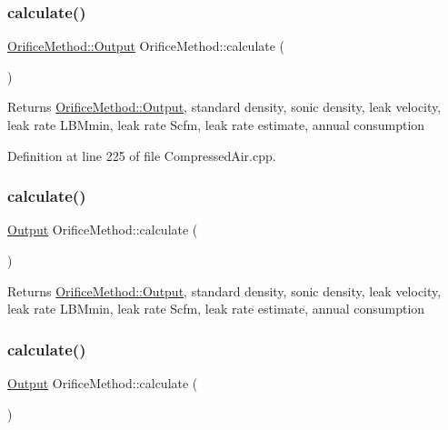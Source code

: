\subsubsection{\texorpdfstring{calculate()}{calculate()}\hspace{0.1cm}{\footnotesize\ttfamily [1/3]}}
{\footnotesize\ttfamily \hyperlink{struct_orifice_method_1_1_output}{Orifice\+Method\+::\+Output} Orifice\+Method\+::calculate (\begin{DoxyParamCaption}{ }\end{DoxyParamCaption})}

\begin{DoxyReturn}{Returns}
\hyperlink{struct_orifice_method_1_1_output}{Orifice\+Method\+::\+Output}, standard density, sonic density, leak velocity, leak rate L\+B\+Mmin, leak rate Scfm, leak rate estimate, annual consumption 
\end{DoxyReturn}


Definition at line 225 of file Compressed\+Air.\+cpp.

\mbox{\label{class_orifice_method_a157ccfd7f2e9ac47e01f3ecc9f049c42}} 
\subsubsection{\texorpdfstring{calculate()}{calculate()}\hspace{0.1cm}{\footnotesize\ttfamily [2/3]}}
{\footnotesize\ttfamily \hyperlink{struct_orifice_method_1_1_output}{Output} Orifice\+Method\+::calculate (\begin{DoxyParamCaption}{ }\end{DoxyParamCaption})}

\begin{DoxyReturn}{Returns}
\hyperlink{struct_orifice_method_1_1_output}{Orifice\+Method\+::\+Output}, standard density, sonic density, leak velocity, leak rate L\+B\+Mmin, leak rate Scfm, leak rate estimate, annual consumption 
\end{DoxyReturn}
\mbox{\label{class_orifice_method_a157ccfd7f2e9ac47e01f3ecc9f049c42}} 
\subsubsection{\texorpdfstring{calculate()}{calculate()}\hspace{0.1cm}{\footnotesize\ttfamily [3/3]}}
{\footnotesize\ttfamily \hyperlink{struct_orifice_method_1_1_output}{Output} Orifice\+Method\+::calculate (\begin{DoxyParamCaption}{ }\end{DoxyParamCaption})}

